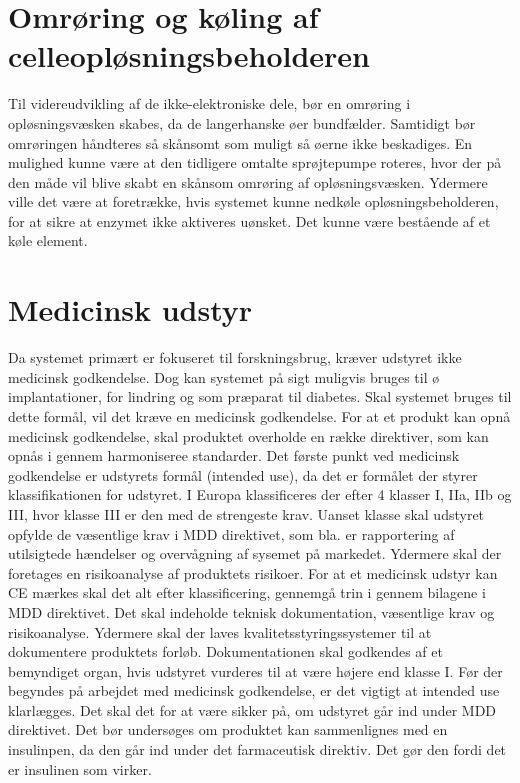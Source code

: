 \section{Omrøring og køling af celleopløsningsbeholderen}
Til videreudvikling af de ikke-elektroniske dele, bør en omrøring i opløsningsvæsken skabes, da de langerhanske øer bundfælder. Samtidigt bør omrøringen håndteres så skånsomt som muligt så øerne ikke beskadiges. En mulighed kunne være at den tidligere omtalte sprøjtepumpe roteres, hvor der på den måde vil blive skabt en skånsom omrøring af opløsningsvæsken. Ydermere ville det være at foretrække, hvis systemet kunne nedkøle opløsningsbeholderen, for at sikre at enzymet ikke aktiveres uønsket. Det kunne være bestående af et køle element. 

\section{Medicinsk udstyr}
 Da systemet primært er fokuseret til forskningsbrug, kræver udstyret ikke medicinsk godkendelse. Dog kan systemet på sigt muligvis bruges til ø implantationer, for lindring og som præparat til diabetes. Skal systemet bruges til dette formål, vil det kræve en medicinsk godkendelse. For at et produkt kan opnå medicinsk godkendelse, skal produktet overholde en række direktiver, som kan opnås i gennem harmoniseree standarder. Det første punkt ved medicinsk godkendelse er udstyrets formål (intended use), da det er formålet der styrer klassifikationen for udstyret. I Europa klassificeres der efter 4 klasser I, IIa, IIb og III, hvor klasse III er den med de strengeste krav. Uanset klasse skal udstyret opfylde de væsentlige krav i MDD direktivet, som bla. er rapportering af utilsigtede hændelser og overvågning af sysemet på markedet. Ydermere skal der foretages en risikoanalyse af produktets risikoer. For at et medicinsk udstyr kan CE mærkes skal det alt efter klassificering, gennemgå trin i gennem bilagene i MDD direktivet. Det skal indeholde teknisk dokumentation, væsentlige krav og risikoanalyse. Ydermere skal der laves kvalitetsstyringssystemer til at dokumentere produktets forløb. Dokumentationen skal godkendes af et bemyndiget organ, hvis udstyret vurderes til at være højere end klasse I. Før der begyndes på arbejdet med medicinsk godkendelse, er det vigtigt at intended use klarlægges. Det skal det for at være sikker på, om udstyret går ind under MDD direktivet. Det bør undersøges om produktet kan sammenlignes med en insulinpen, da den går ind under det farmaceutisk direktiv. Det gør den fordi det er insulinen som virker. 